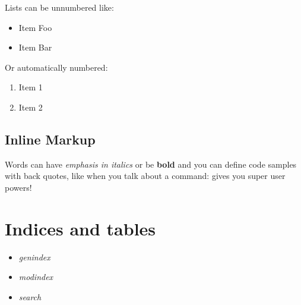 \documentclass[a4paper,12pt,spanish]{sphinxmanual}
\begin{document}
Lists can be unnumbered like:
\begin{itemize}
\item {} 
Item Foo

\item {} 
Item Bar

\end{itemize}

Or automatically numbered:
\begin{enumerate}
\item {} 
Item 1

\item {} 
Item 2

\end{enumerate}


\section{Inline Markup}
\label{example:inline-markup}
Words can have \emph{emphasis in italics} or be \textbf{bold} and you can define
code samples with back quotes, like when you talk about a command: 
gives you super user powers!


\chapter{Indices and tables}
\label{index:indices-and-tables}\begin{itemize}
\item {} 
\emph{genindex}

\item {} 
\emph{modindex}

\item {} 
\emph{search}

\end{itemize}



\renewcommand{\indexname}{Índice}
\printindex
\end{document}
